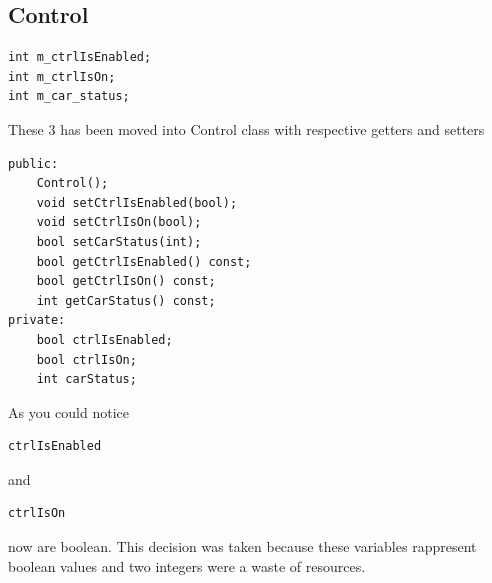 \documentclass[12pt, letterpaper]{article}
\begin{document}
\begin{flushleft}
\subsection{Control}
\begin{verbatim}
int m_ctrlIsEnabled;
int m_ctrlIsOn;
int m_car_status;
\end{verbatim}
These 3 has been moved into Control class with respective getters and setters
\begin{verbatim}
public:
    Control();
    void setCtrlIsEnabled(bool);
    void setCtrlIsOn(bool);
    bool setCarStatus(int);
    bool getCtrlIsEnabled() const;
    bool getCtrlIsOn() const;
    int getCarStatus() const;
private:
    bool ctrlIsEnabled;
    bool ctrlIsOn;
    int carStatus;
\end{verbatim}
As you could notice \begin{verbatim}ctrlIsEnabled\end{verbatim} and \begin{verbatim}ctrlIsOn\end{verbatim} now are boolean. This decision was taken because these variables rappresent boolean values and two integers were a waste of resources.

\end{flushleft}
\end{document}
